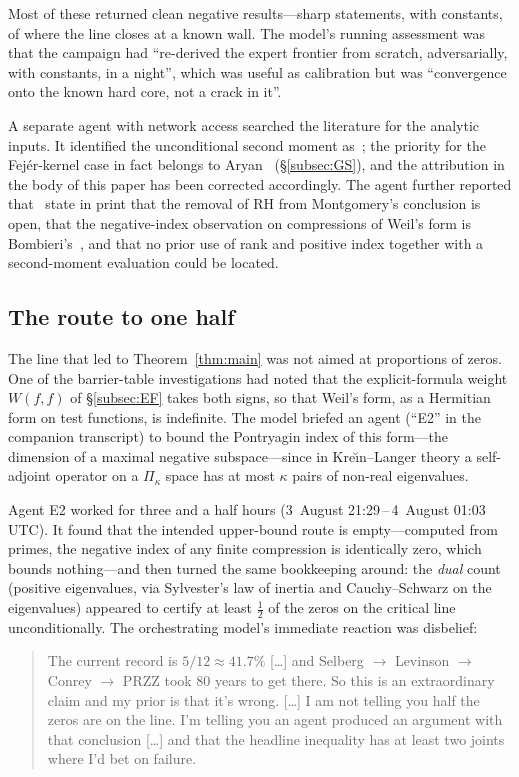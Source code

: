 \documentclass[11pt]{amsart}
\theoremstyle{definition}
\theoremstyle{remark}
\numberwithin{equation}{section}
\begin{document}
Most of these returned clean negative results---sharp statements, with constants, of where the line closes at a known wall. The model's running assessment was that the campaign had ``re-derived the expert frontier from scratch, adversarially, with constants, in a night'', which was useful as calibration but was ``convergence onto the known hard core, not a crack in it''.

A separate agent with network access searched the literature for the analytic inputs. It identified the unconditional second moment as~\cite{BGSTB24}; the priority for the Fej\'er-kernel case in fact belongs to Aryan~\cite{Ary22} (\S\ref{subsec:GS}), and the attribution in the body of this paper has been corrected accordingly. The agent further reported that~\cite{GS25,GS26} state in print that the removal of RH from Montgomery's conclusion is open, that the negative-index observation on compressions of Weil's form is Bombieri's~\cite{Bom00}, and that no prior use of rank and positive index together with a second-moment evaluation could be located.

\subsection{The route to one half}\label{app:half}

The line that led to Theorem~\ref{thm:main} was not aimed at proportions of zeros. One of the barrier-table investigations had noted that the explicit-formula weight $W(f,f)$ of \S\ref{subsec:EF} takes both signs, so that Weil's form, as a Hermitian form on test functions, is indefinite. The model briefed an agent (``E2'' in the companion transcript) to bound the Pontryagin index of this form---the dimension of a maximal negative subspace---since in Kre\u{\i}n--Langer theory a self-adjoint operator on a $\Pi_\kappa$ space has at most $\kappa$ pairs of non-real eigenvalues.

Agent E2 worked for three and a half hours (3~August 21:29\,--\,4~August 01:03 UTC). It found that the intended upper-bound route is empty---computed from primes, the negative index of any finite compression is identically zero, which bounds nothing---and then turned the same bookkeeping around: the \emph{dual} count (positive eigenvalues, via Sylvester's law of inertia and Cauchy--Schwarz on the eigenvalues) appeared to certify at least $\tfrac12$ of the zeros on the critical line unconditionally. The orchestrating model's immediate reaction was disbelief:
\begin{quote}\small
The current record is $5/12\approx41.7\%$ [\ldots] and Selberg $\to$ Levinson $\to$ Conrey $\to$ PRZZ took 80 years to get there. So this is an extraordinary claim and my prior is that it's wrong. [\ldots] I am not telling you half the zeros are on the line. I'm telling you an agent produced an argument with that conclusion [\ldots] and that the headline inequality has at least two joints where I'd bet on failure.
\end{quote}
\end{document}
